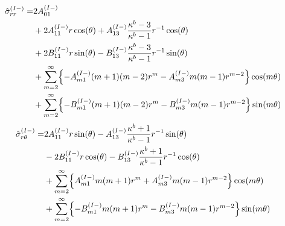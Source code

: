 \begin{align}
	\hat{\sigma}_{rr}^{(I-)} =&2A_{01}^{(I-)}
	\nonumber
	\\
	&+2A_{11}^{(I-)}r\cos(\theta)
	+A_{13}^{(I-)}\frac{\kappa^{b}-3}{\kappa^{b}-1}r^{-1}\cos(\theta)
	\nonumber
	\\
	&+2B_{11}^{(I-)}r\sin(\theta)
	-B_{13}^{(I-)}\frac{\kappa^{b}-3}{\kappa^{b}-1}r^{-1}\sin(\theta)
	\nonumber
	\\
	&+\sum_{m=2}^{\infty}\Bigl\{-A_{m1}^{(I-)}(m+1)(m-2)r^{m}
	-A_{m3}^{(I-)}m(m-1)r^{m-2}\Bigr\}\cos(m\theta)
	\nonumber
	\\
	&+\sum_{m=2}^{\infty}\Bigl\{-B_{m1}^{(I-)}(m+1)(m-2)r^{m}
	-B_{m3}^{(I-)}m(m-1)r^{m-2}\Bigr\}\sin(m\theta)
	\label{eq:SigmaRRIn1}
\end{align}
\begin{align}
	\hat{\sigma}_{r\theta}^{(I-)} =
	&2A_{11}^{(I-)}r\sin(\theta)
	-A_{13}^{(I-)}\frac{\kappa^{b}+1}{\kappa^{b}-1}r^{-1}\sin(\theta)
	\nonumber
	\\
	&-2B_{11}^{(I-)}r\cos(\theta)
	-B_{13}^{(I-)}\frac{\kappa^{b}+1}{\kappa^{b}-1}r^{-1}\cos(\theta)
	\nonumber
	\\
	&+\sum_{m=2}^{\infty}\Bigl\{A_{m1}^{(I-)}m(m+1)r^{m}
	+A_{m3}^{(I-)}m(m-1)r^{m-2}\Bigr\}\cos(m\theta)
	\nonumber
	\\
	&+\sum_{m=2}^{\infty}\Bigl\{-B_{m1}^{(I-)}m(m+1)r^{m}
	-B_{m3}^{(I-)}m(m-1)r^{m-2}\Bigr\}\sin(m\theta)
	\label{eq:SigmaRThIn1}
\end{align}

\newpage
